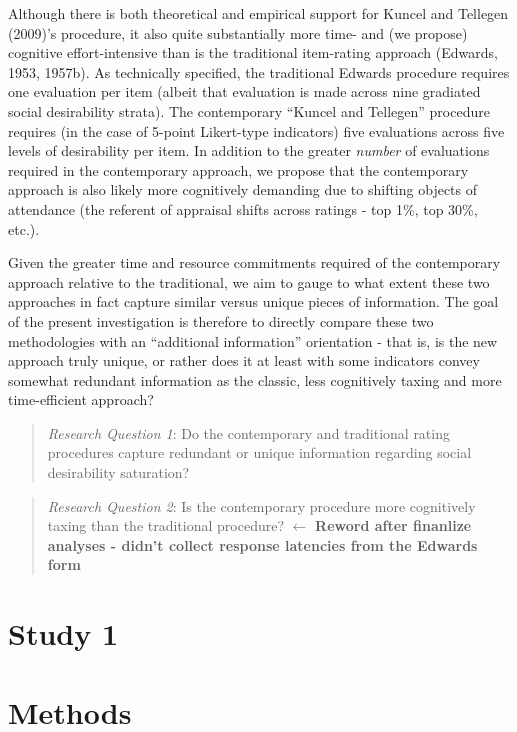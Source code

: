\documentclass[
  ,jou]{apa6}
\begin{document}
Although there is both theoretical and empirical support for Kuncel and Tellegen (2009)'s procedure, it also quite substantially more time- and (we propose) cognitive effort-intensive than is the traditional item-rating approach (Edwards, 1953, 1957b). As technically specified, the traditional Edwards procedure requires one evaluation per item (albeit that evaluation is made across nine gradiated social desirability strata). The contemporary ``Kuncel and Tellegen'' procedure requires (in the case of 5-point Likert-type indicators) five evaluations across five levels of desirability per item. In addition to the greater \emph{number} of evaluations required in the contemporary approach, we propose that the contemporary approach is also likely more cognitively demanding due to shifting objects of attendance (the referent of appraisal shifts across ratings - top 1\%, top 30\%, etc.).

Given the greater time and resource commitments required of the contemporary approach relative to the traditional, we aim to gauge to what extent these two approaches in fact capture similar versus unique pieces of information. The goal of the present investigation is therefore to directly compare these two methodologies with an ``additional information'' orientation - that is, is the new approach truly unique, or rather does it at least with some indicators convey somewhat redundant information as the classic, less cognitively taxing and more time-efficient approach?

\begin{quote}
\emph{Research Question 1}: Do the contemporary and traditional rating procedures capture redundant or unique information regarding social desirability saturation?
\end{quote}

\begin{quote}
\emph{Research Question 2}: Is the contemporary procedure more cognitively taxing than the traditional procedure? \(\leftarrow\) \textbf{Reword after finanlize analyses - didn't collect response latencies from the Edwards form}
\end{quote}

\hypertarget{study-1}{%
\section{Study 1}\label{study-1}}

\hypertarget{methods}{%
\section{Methods}\label{methods}}
\end{document}

